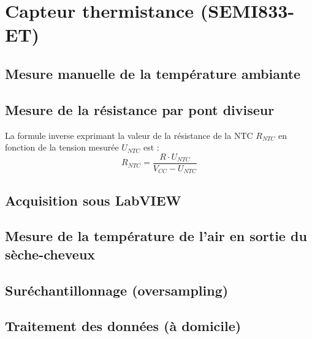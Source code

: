 \section{Capteur thermistance (SEMI833-ET)}

\subsection{Mesure manuelle de la température ambiante}

\subsection{Mesure de la résistance par pont diviseur}

La formule inverse exprimant la valeur de la résistance de la NTC $R_{NTC}$ en fonction de la tension mesurée $U_{NTC}$ est :
\begin{equation}
    R_{NTC} = \frac{R \cdot U_{NTC}}{V_{CC} - U_{NTC}}
\end{equation}

\subsection{Acquisition sous LabVIEW}

\subsection{Mesure de la température de l'air en sortie du sèche-cheveux}

\subsection{Suréchantillonnage (oversampling)}

\subsection{Traitement des données (à domicile)}
